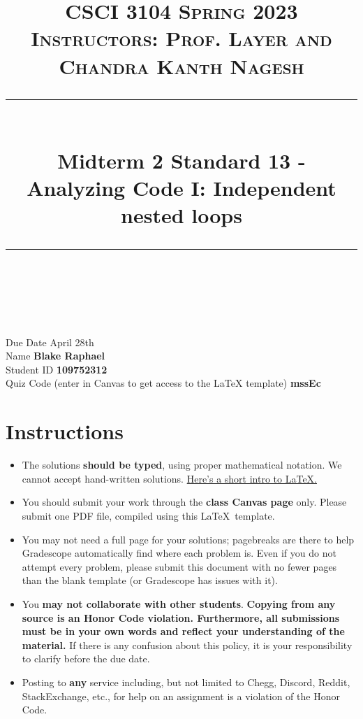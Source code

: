 \documentclass[11pt]{article}
\title{
\normalfont \normalsize 
\textsc{CSCI 3104 Spring 2023 \\
Instructors: Prof. Layer and Chandra Kanth Nagesh} \\
[10pt] 
\rule{\linewidth}{0.5pt} \\[6pt] 
\huge Midterm 2 Standard 13 - Analyzing Code I: Independent nested loops
\rule{\linewidth}{2pt}  \\[10pt]
}
\date{}
\theoremstyle{definition}
\theoremstyle{definition}
\theoremstyle{definition}
\begin{document}
\maketitle


\noindent
Due Date \dotfill April 28th \\
Name \dotfill \textbf{Blake Raphael} \\
Student ID \dotfill \textbf{109752312} \\
Quiz Code (enter in Canvas to get access to the LaTeX template) \dotfill \textbf{ mssEc } \\

\tableofcontents

\section{Instructions}
 \begin{itemize}
	\item The solutions \textbf{should be typed}, using proper mathematical notation. We cannot accept hand-written solutions. \href{http://ece.uprm.edu/~caceros/latex/introduction.pdf}{Here's a short intro to \LaTeX.}
	\item You should submit your work through the \textbf{class Canvas page} only. Please submit one PDF file, compiled using this \LaTeX \ template.
	\item You may not need a full page for your solutions; pagebreaks are there to help Gradescope automatically find where each problem is. Even if you do not attempt every problem, please submit this document with no fewer pages than the blank template (or Gradescope has issues with it).

	\item You \textbf{may not collaborate with other students}. \textbf{Copying from any source is an Honor Code violation. Furthermore, all submissions must be in your own words and reflect your understanding of the material.} If there is any confusion about this policy, it is your responsibility to clarify before the due date. 

	\item Posting to \textbf{any} service including, but not limited to Chegg, Discord, Reddit, StackExchange, etc., for help on an assignment is a violation of the Honor Code.

	\end{itemize}
\newpage
\end{document}
